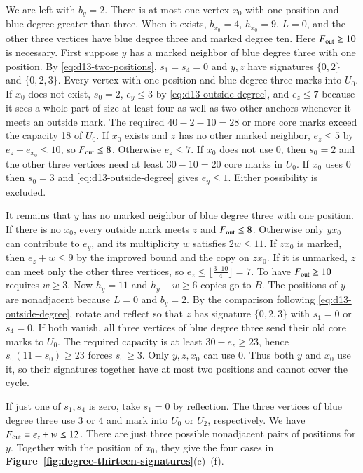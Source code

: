 We are left with $b_y=2$. There is at most one vertex $x_0$ with
one position and blue degree greater than three. When it exists,
$b_{x_0}=4$, $h_{x_0}=9$, $L=0$, and the other three vertices have
blue degree three and marked degree ten. Here $F_{\rm out}\ge10$
is necessary. First suppose $y$ has a marked neighbor of blue degree
three with one position. By \eqref{eq:d13-two-positions}, $s_1=s_4=0$
and $y,z$ have
signatures $\{0,2\}$ and $\{0,2,3\}$. Every vertex with one position
and blue degree three marks into $U_0$. If $x_0$ does not exist,
$s_0=2$, $e_y\le3$ by \eqref{eq:d13-outside-degree}, and
$e_z\le7$ because it sees a whole part of size at least four as
well as two other anchors whenever it meets an outside mark.
The required $40-2-10=28$ or more core marks exceed the capacity
18 of $U_0$. If $x_0$ exists and $z$ has no other marked neighbor,
$e_z\le5$ by $e_z+e_{x_0}\le10$, so $F_{\rm out}\le8$.
Otherwise $e_z\le7$. If $x_0$ does not use 0, then $s_0=2$ and
the other three vertices need at least $30-10=20$ core marks in
$U_0$. If $x_0$ uses 0 then $s_0=3$ and
\eqref{eq:d13-outside-degree} gives $e_y\le1$. Either possibility
is excluded.

It remains that $y$ has no marked neighbor of blue degree three
with one position. If there is no $x_0$, every outside mark meets
$z$ and $F_{\rm out}\le8$. Otherwise only $yx_0$ can contribute
to $e_y$, and its multiplicity $w$ satisfies $2w\le11$. If $zx_0$
is marked, then $e_z+w\le9$ by the improved bound and the copy on
$zx_0$. If it is unmarked, $z$ can meet only the other three vertices,
so $e_z\le\lfloor\frac{3\cdot10}{4}\rfloor=7$. To have $F_{\rm out}\ge10$
requires $w\ge3$. Now $h_y=11$ and $h_y-w\ge6$ copies go to $B$.
The positions of $y$ are nonadjacent because $L=0$ and $b_y=2$.
By the comparison following \eqref{eq:d13-outside-degree}, rotate
and reflect so that $z$ has signature $\{0,2,3\}$ with
$s_1=0$ or $s_4=0$. If both vanish, all three vertices of blue
degree three send their old core marks to $U_0$. The required
capacity is at least $30-e_z\ge23$, hence $s_0(11-s_0)\ge23$
forces $s_0\ge3$. Only $y,z,x_0$ can use 0. Thus both $y$ and
$x_0$ use it, so their signatures together have at most two positions
and cannot cover the cycle.

If just one of $s_1,s_4$ is zero, take $s_1=0$ by reflection.
The three vertices of blue degree three use 3 or 4 and mark into
$U_0$ or $U_2$, respectively. We have $F_{\rm out}=e_z+w\le12$.
There are just three possible nonadjacent pairs of positions for $y$.
Together with the position of $x_0$, they give the four cases in
\textbf{Figure~\ref{fig:degree-thirteen-signatures}}(c)--(f).

